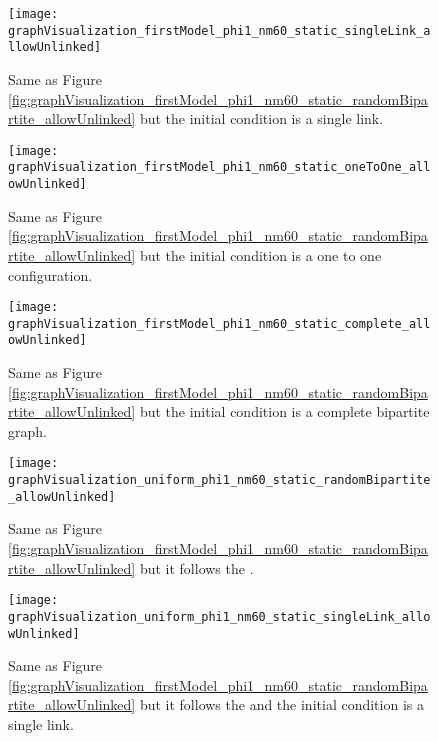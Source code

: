 \begin{figure}
  \centering
  \texttt{[image: graphVisualization\_firstModel\_phi1\_nm60\_static\_singleLink\_allowUnlinked]}
  \caption{Same as Figure \ref{fig:graphVisualization_firstModel_phi1_nm60_static_randomBipartite_allowUnlinked} but the initial condition is a single link.}
  \label{fig:graphVisualization_firstModel_phi1_nm60_static_singleLink_allowUnlinked}
\end{figure}

\begin{figure}
  \centering
  \texttt{[image: graphVisualization\_firstModel\_phi1\_nm60\_static\_oneToOne\_allowUnlinked]}
  \caption{Same as Figure \ref{fig:graphVisualization_firstModel_phi1_nm60_static_randomBipartite_allowUnlinked} but the initial condition is a one to one configuration.}
  \label{fig:graphVisualization_firstModel_phi1_nm60_static_oneToOne_allowUnlinked}
\end{figure}

\begin{figure}
  \centering
  \texttt{[image: graphVisualization\_firstModel\_phi1\_nm60\_static\_complete\_allowUnlinked]}
  \caption{Same as Figure \ref{fig:graphVisualization_firstModel_phi1_nm60_static_randomBipartite_allowUnlinked} but the initial condition is a complete bipartite graph.}
  \label{fig:graphVisualization_firstModel_phi1_nm60_static_complete_allowUnlinked}
\end{figure}

\begin{figure}
  \centering
  \texttt{[image: graphVisualization\_uniform\_phi1\_nm60\_static\_randomBipartite\_allowUnlinked]}
  \caption{Same as Figure \ref{fig:graphVisualization_firstModel_phi1_nm60_static_randomBipartite_allowUnlinked} but it follows the \secondmodel{}.}
  \label{fig:graphVisualization_uniform_phi1_nm60_static_randomBipartite_allowUnlinked}
\end{figure}

\begin{figure}
  \centering
  \texttt{[image: graphVisualization\_uniform\_phi1\_nm60\_static\_singleLink\_allowUnlinked]}
  \caption{Same as Figure \ref{fig:graphVisualization_firstModel_phi1_nm60_static_randomBipartite_allowUnlinked} but it follows the \secondmodel{} and the initial condition is a single link.}
  \label{fig:graphVisualization_uniform_phi1_nm60_static_singleLink_allowUnlinked}
\end{figure}

